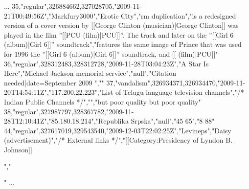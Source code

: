 ...
35,"regular",326884662,327028705,"2009-11-21T00:49:56Z","Markfury3000","Erotic City","rm duplication","is a redesigned version of  a cover version by [[George Clinton (musician)|George Clinton]] was played in the film ''[[PCU (film)|PCU]]''. The track   and later on the ''[[Girl 6 (album)|Girl 6]]'' soundtrack","features the same image of Prince that was used for 1996  the ''[[Girl 6 (album)|Girl 6]]'' soundtrack, and  [[  (film)|PCU]]"
36,"regular",328312483,328312728,"2009-11-28T03:04:23Z","A Star Is Here","Michael Jackson memorial service","null","{{Citation needed|date=September 2009}} ",""
37,"vandalism",326934371,326934470,"2009-11-20T14:54:11Z","117.200.22.223","List of Telugu language television channels","/* Indian Public Channels */","","but poor quality but poor quality"
38,"regular",327987797,328367782,"2009-11-28T12:10:41Z","85.180.18.214","Republika Srpska","null","45 65","8 88"
44,"regular",327617019,329543540,"2009-12-03T22:02:25Z","Levineps","Daisy (advertisement)","/* External links */","[[Category:Presidency of Lyndon B. Johnson]]

 

","

"
...
